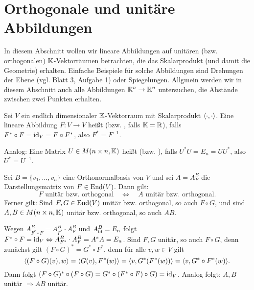 \section{Orthogonale und unitäre Abbildungen}
\label{sec:2.6}

In diesem Abschnitt wollen wir lineare Abbildungen auf unitären (bzw. orthogonalen) $\mathbb{K}$-Vektorräumen betrachten, die das Skalarprodukt (und damit die Geometrie) erhalten.
Einfache Beispiele für solche Abbildungen sind Drehungen der Ebene (vgl. Blatt 3, Aufgabe 1) oder Spiegelungen.
Allgmein werden wir in diesem Abschnitt auch alle Abbildungen $\mathbb{R}^n \rightarrow \mathbb{R}^n$ untersuchen, die Abstände zwischen zwei Punkten erhalten.

\begin{definition}
	\label{def:6.1}
	Sei $V$ ein endlich dimensionaler $\mathbb{K}$-Vektorraum mit Skalarprodukt $\left\langle\cdot,\cdot\right\rangle$.
	Eine lineare Abbildung $F \colon V \rightarrow V$ heißt  (bzw. , falls $\mathbb{K}= \mathbb{R}$), falls $F^* \circ F = \operatorname{id}_V = F \circ F^*$, also $F^* = F^{-1}$.
	
	Analog: Eine Matrix $U \in M(n \times n,\mathbb{K})$ heißt  (bzw. ), falls $U^*U = E_n = UU^*$, also $U^* = U^{-1}$.
\end{definition}

\begin{lemma}
	\label{lemma:6.2}
	Sei $B = \{v_1,\dots,v_n\}$ eine Orthonormalbasis von $V$ und sei $A = A^B_F$ die Darstellungsmatrix von $F \in \operatorname{End}(V)$.
	Dann gilt: 
	\[
		F \text{ unitär bzw. orthogonal} \quad \Leftrightarrow \quad A \text{ unitär bzw. orthogonal}.
	\]
	Ferner gilt:
	Sind $F,G \in \operatorname{End}(V)$ unitär bzw. orthogonal, so auch $F \circ G$, und sind $A,B \in M(n \times n, \mathbb{K})$ unitär bzw. orthogonal, so auch $AB$.
\end{lemma}

\begin{beweis}
	Wegen $A_{F^* \circ F}^B = A_{F^*}^B \cdot A_F^B$ und $A_{\operatorname{id}}^B = E_n$ folgt $F^* \circ F = \operatorname{id}_V \Leftrightarrow A_{F^*}^B \cdot A_F^B = A^*A = E_n$.
	Sind $F,G$ unitär, so auch $F \circ G$, denn zunächst gilt $(F \circ G)^* = G^* \circ F^*$, denn für alle $v,w \in V$ gilt
	\[
		\sk{(F \circ G)(v),w} = \sk{G(v),F^*(w)} = \sk{v,G^*(F^*(w))} = \sk{v,G^*\circ F^*(w)}.
	\]
	Dann folgt $(F \circ G)^* \circ (F \circ G) = G^* \circ (F^* \circ F) \circ G ) = \operatorname{id}_V$.
	Analog folgt: $A,B$ unitär $\Rightarrow AB$ unitär. \qedhere
\end{beweis}

